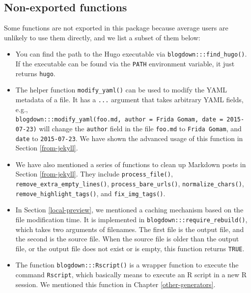 \documentclass[12pt,]{krantz}
\theoremstyle{definition}
\theoremstyle{definition}
\theoremstyle{definition}
\theoremstyle{remark}
\begin{document}
\hypertarget{non-exported-functions}{%
\subsection{Non-exported functions}\label{non-exported-functions}}

Some functions are not exported in this package because average users
are unlikely to use them directly, and we list a subset of them below:

\begin{itemize}
\item
  You can find the path to the Hugo executable via
  \texttt{blogdown:::find\_hugo()}. If the executable can be found via
  the \texttt{PATH} environment variable, it just returns
  \texttt{\textquotesingle{}hugo\textquotesingle{}}.
\item
  The helper function \texttt{modify\_yaml()} can be used to modify the
  YAML metadata of a file. It has a \texttt{...} argument that takes
  arbitrary YAML fields, e.g.,
  \texttt{blogdown:::modify\_yaml(\textquotesingle{}foo.md\textquotesingle{},\ author\ =\ \textquotesingle{}Frida\ Gomam\textquotesingle{},\ date\ =\ \textquotesingle{}2015-07-23\textquotesingle{})}
  will change the \texttt{author} field in the file \texttt{foo.md} to
  \texttt{Frida\ Gomam}, and \texttt{date} to \texttt{2015-07-23}. We
  have shown the advanced usage of this function in Section
  \ref{from-jekyll}.
\item
  We have also mentioned a series of functions to clean up Markdown
  posts in Section \ref{from-jekyll}. They include
  \texttt{process\_file()}, \texttt{remove\_extra\_empty\_lines()},
  \texttt{process\_bare\_urls()}, \texttt{normalize\_chars()},
  \texttt{remove\_highlight\_tags()}, and \texttt{fix\_img\_tags()}.
\item
  In Section \ref{local-preview}, we mentioned a caching mechanism based
  on the file modification time. It is implemented in
  \texttt{blogdown:::require\_rebuild()}, which takes two arguments of
  filenames. The first file is the output file, and the second is the
  source file. When the source file is older than the output file, or
  the output file does not exist or is empty, this function returns
  \texttt{TRUE}.
\item
  The function \texttt{blogdown:::Rscript()} is a wrapper function to
  execute the command \texttt{Rscript}, which basically means to execute
  an R script in a new R session. We mentioned this function in Chapter
  \ref{other-generators}.
\end{itemize}
\end{document}
